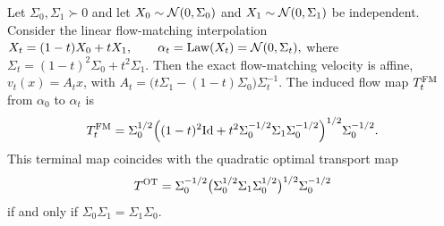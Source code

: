 \begin{prop}\label{prop-gaussian-flow-matching-optimality}
Let $\Sigma_0,\Sigma_1\succ0$ and let $X_0\sim\mathcal{N}(0,\Sigma_0)$ and $X_1\sim\mathcal{N}(0,\Sigma_1)$ be independent. Consider the linear flow-matching interpolation
\(X_t=(1-t)X_0+tX_1, \qquad \alpha_t=\operatorname{Law}(X_t)=\mathcal{N}(0,\Sigma_t),\)
where $\Sigma_t=(1-t)^2\Sigma_0+t^2\Sigma_1$. Then the exact flow-matching velocity is affine, $v_t(x)=A_tx$, with $A_t=\bigl(t\Sigma_1-(1-t)\Sigma_0\bigr)\Sigma_t^{-1}$.
The induced flow map $T_t^{\rm FM}$ from $\alpha_0$ to $\alpha_t$ is
\begin{equation}\label{eq-gaussian-product-fm-map}
T_t^{\rm FM}
=
\Sigma_0^{1/2}
\Bigl((1-t)^2\mathrm{Id}+t^2\Sigma_0^{-1/2}\Sigma_1\Sigma_0^{-1/2}\Bigr)^{1/2}
\Sigma_0^{-1/2}.
\end{equation}
This terminal map coincides with the quadratic optimal transport map
\begin{equation}\label{eq-gaussian-brenier-map-comparison}
T^{\rm OT}
=
\Sigma_0^{-1/2}
\bigl(\Sigma_0^{1/2}\Sigma_1\Sigma_0^{1/2}\bigr)^{1/2}
\Sigma_0^{-1/2}
\end{equation}
if and only if $\Sigma_0\Sigma_1=\Sigma_1\Sigma_0$.
\end{prop}
